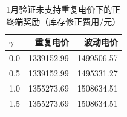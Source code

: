 \begin{table}[H]\centering\small
\caption{1月验证未支持重复电价下的正终端奖励（库存修正费用/元）}\label{tab:terminal_validation}
\begin{tabular}{lrr}\toprule
$\gamma$ & 重复电价 & 波动电价 \\\midrule
0.0 & 1339152.99 & 1499506.57 \\
0.5 & 1339152.99 & 1495331.27 \\
1.0 & 1355273.69 & 1508634.51 \\
1.5 & 1355273.69 & 1508634.51 \\
\bottomrule\end{tabular}\end{table}
